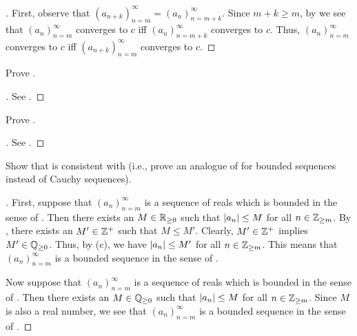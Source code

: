 \begin{proof}[]
  First, observe that \((a_{n + k})_{n = m}^\infty = (a_n)_{n = m + k}^\infty\).
  Since \(m + k \geq m\), by  we see that \((a_n)_{n = m}^\infty\) converges to \(c\) iff \((a_n)_{n = m + k}^\infty\) converges to \(c\).
  Thus, \((a_n)_{n = m}^\infty\) converges to \(c\) iff \((a_{n + k})_{n = m}^\infty\) converges to \(c\).
\end{proof}

\begin{ex}\label{i:ex:6.1.5}
  Prove .
\end{ex}

\begin{proof}[]
  See .
\end{proof}

\begin{ex}\label{i:ex:6.1.6}
  Prove .
\end{ex}

\begin{proof}[]
  See .
\end{proof}

\begin{ex}\label{i:ex:6.1.7}
  Show that  is consistent with 
  (i.e., prove an analogue of  for bounded sequences instead of Cauchy sequences).
\end{ex}

\begin{proof}[]
  First, suppose that \((a_n)_{n = m}^\infty\) is a sequence of reals which is bounded in the sense of .
  Then there exists an \(M \in \mathbb{R}_{\geq 0}\) such that \(\left\lvert a_n\right\rvert \leq M\) for all \(n \in \mathbb{Z}_{\geq m}\).
  By , there exists an \(M' \in \mathbb{Z}^+\) such that \(M \leq M'\).
  Clearly, \(M' \in \mathbb{Z}^+\) implies \(M' \in \mathbb{Q}_{\geq 0}\).
  Thus, by (c), we have \(\left\lvert a_n\right\rvert \leq M'\) for all \(n \in \mathbb{Z}_{\geq m}\).
  This means that \((a_n)_{n = m}^\infty\) is a bounded sequence in the sense of .

  Now suppose that \((a_n)_{n = m}^\infty\) is a sequence of reals which is bounded in the sense of .
  Then there exists an \(M \in \mathbb{Q}_{\geq 0}\) such that \(\left\lvert a_n\right\rvert \leq M\) for all \(n \in \mathbb{Z}_{\geq m}\).
  Since \(M\) is also a real number, we see that \((a_n)_{n = m}^\infty\) is a bounded sequence in the sense of .
\end{proof}

